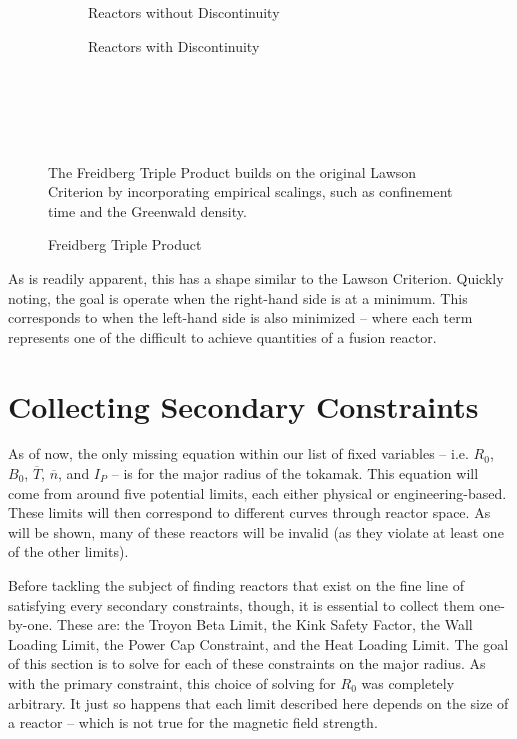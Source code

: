 \begin{figure*}[h]
    \centering
    \hfill 
    \begin{subfigure}[t]{0.45\textwidth}
        \centering
		\begin{adjustbox}{width=\textwidth}
			\Large
			
		\end{adjustbox}
        \caption{Reactors without Discontinuity}
    \end{subfigure}
    \hfill
    \begin{subfigure}[t]{0.45\textwidth}
        \centering
		\begin{adjustbox}{width=\textwidth}
			\Large
			
		\end{adjustbox}
        \caption{Reactors with Discontinuity}
    \end{subfigure}
    \hfill \hfill ~\\ ~\\ ~\\
    \caption{Freidberg Triple Product} ~\\
    \small The Freidberg Triple Product builds on the original Lawson Criterion by incorporating empirical scalings, such as confinement time and the Greenwald density.
\end{figure*}

As is readily apparent, this has a shape similar to the Lawson Criterion. Quickly noting, the goal is operate when the right-hand side is at a minimum. This corresponds to when the left-hand side is also minimized -- where each term represents one of the difficult to achieve quantities of a fusion reactor.

\section{Collecting Secondary Constraints}

As of now, the only missing equation within our list of fixed variables -- i.e. $R_0$, $B_0$, $\overline T$, $\overline n$, and $I_P$ -- is for the major radius of the tokamak. This equation will come from around five potential limits, each either physical or engineering-based. These limits will then correspond to different curves through reactor space. As will be shown, many of these reactors will be invalid (as they violate at least one of the other limits).

Before tackling the subject of finding reactors that exist on the fine line of satisfying every secondary constraints, though, it is essential to collect them one-by-one. These are: the Troyon Beta Limit, the Kink Safety Factor, the Wall Loading Limit, the Power Cap Constraint, and the Heat Loading Limit. The goal of this section is to solve for each of these constraints on the major radius. As with the primary constraint, this choice of solving for $R_0$ was completely arbitrary. It just so happens that each limit described here depends on the size of a reactor -- which is not true for the magnetic field strength.


